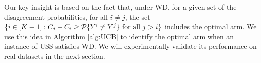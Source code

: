 %
Our key insight is based on the fact that,
under WD, for a given set of the disagreement probabilities, for all $i \neq j$, the set $\{i \in [K-1]: C_j - C_i \geq \P\{Y^i \neq Y^j\} \mbox{ for all } j>i\}$ includes the optimal arm. We use this idea in Algorithm \ref{alg:UCB} to identify the optimal arm when an instance of USS satisfies WD. We will experimentally validate its performance on real datasets in the next section.

